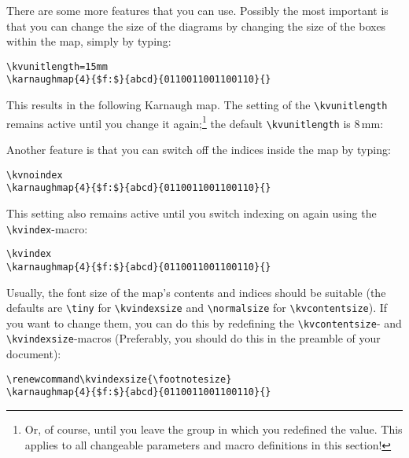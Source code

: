 \documentclass{article}
\begin{document}
There are some more features that you can use. Possibly the most important is
that  you can change the size of the diagrams by changing the size of the
boxes within the map, simply by typing:

\begin{verbatim}
\kvunitlength=15mm
\karnaughmap{4}{$f:$}{abcd}{0110011001100110}{}
\end{verbatim}

This results in the following Karnaugh map. The setting of the
\verb|\kvunitlength| remains active until you change it again;\footnote{Or, of
  course, until you leave the group in which you redefined the value. This
  applies to all changeable parameters and macro definitions in this section!}
the default \verb|\kvunitlength| is 8\,mm:

\begin{center}
\kvunitlength=15mm
\end{center}

Another feature is that you can switch off the indices inside the map by
typing: 

\begin{verbatim}
\kvnoindex
\karnaughmap{4}{$f:$}{abcd}{0110011001100110}{}
\end{verbatim}

\begin{center}
\kvunitlength=8mm
\kvnoindex
{}
\end{center}

This setting also remains active until you switch indexing on again using the
\verb|\kvindex|-macro:

\begin{verbatim}
\kvindex
\karnaughmap{4}{$f:$}{abcd}{0110011001100110}{}
\end{verbatim}

\begin{center}
\kvindex
{}
\end{center}

Usually, the font size of the map's contents and indices should be
suitable (the defaults are \verb|\tiny| for \verb|\kvindexsize| and
\verb|\normalsize| for \verb|\kvcontentsize|). If you want to change them, you
can do this by redefining the \verb|\kvcontentsize|- and
\verb|\kvindexsize|-macros (Preferably, you should do this in the preamble of
your document):  

\begin{verbatim}
\renewcommand\kvindexsize{\footnotesize}
\karnaughmap{4}{$f:$}{abcd}{0110011001100110}{}
\end{verbatim}
\end{document}
